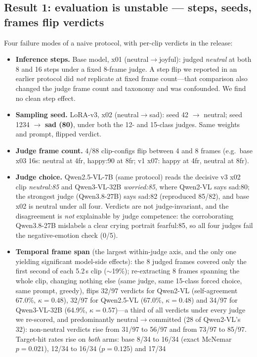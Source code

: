 \documentclass{article}
\begin{document}
\subsection{Result 1: evaluation is unstable --- steps, seeds, frames flip verdicts}
Four failure modes of a naive protocol, with per-clip verdicts in the release:
\begin{itemize}
\item \textbf{Inference steps.} Base model, x01 (neutral$\rightarrow$joyful): judged \emph{neutral}
at both 8 and 16 steps under a fixed 8-frame judge. A step flip we reported in an earlier protocol
did \emph{not} replicate at fixed frame count---that comparison also changed the judge frame count
and taxonomy and was confounded. We find no clean step effect.
\item \textbf{Sampling seed.} LoRA-v3, x02 (neutral$\rightarrow$sad): seed 42
$\rightarrow$ neutral; seed 1234 $\rightarrow$ \textbf{sad (80)}, under both the 12- and 15-class
judges. Same weights and prompt, flipped verdict.
\item \textbf{Judge frame count.} 4/88 clip-configs flip between 4 and 8 frames (e.g.\ base
x03 16s: neutral at 4fr, happy:90 at 8fr; v1 x07: happy at 4fr, neutral at 8fr).
\item \textbf{Judge choice.} Qwen2.5-VL-7B (same protocol) reads the decisive v3 x02 clip
\emph{neutral:85} and Qwen3-VL-32B \emph{worried:85}, where Qwen2-VL says sad:80; the strongest
judge (Qwen3.8-27B) says sad:82 (reproduced 85/82), and base x02 is neutral under all four. Verdicts
are not judge-invariant, and the disagreement is \emph{not} explainable by judge competence: the
corroborating Qwen3.8-27B mislabels a clear crying portrait fearful:85, so all four judges fail the
negative-emotion check (0/5).
\item \textbf{Temporal frame span} (the largest within-judge axis, and the only one yielding significant model-side effects): the 8 judged frames
covered only the first second of each 5.2\,s clip ($\sim$19\%); re-extracting 8 frames spanning the
whole clip, changing nothing else (same judge, same 15-class forced choice, same prompt, greedy),
flips 32/97 verdicts for Qwen2-VL (self-agreement 67.0\%, $\kappa{=}0.48$), 32/97 for Qwen2.5-VL
(67.0\%, $\kappa{=}0.48$) and 34/97 for Qwen3-VL-32B (64.9\%, $\kappa{=}0.57$)---a third of all verdicts
under every judge we re-scored, and predominantly neutral$\rightarrow$committed (28 of Qwen2-VL's 32):
non-neutral verdicts rise from 31/97 to 56/97 and from 73/97 to 85/97. Target-hit rates rise on
\emph{both} arms: base 8/34 to 16/34 (exact McNemar $p{=}0.021$), 12/34 to 16/34 ($p{=}0.125$) and 17/34

\end{itemize}
\end{document}
